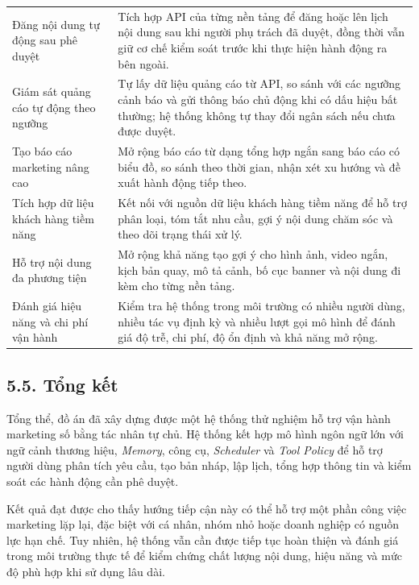 \documentclass[a4paper]{article}
\renewcommand{\arraystretch}{1.25}
\newcommand{\secx}[1]{\subsection*{#1}\phantomsection\addcontentsline{toc}{subsection}{#1}}
\begin{document}
\begin{longtable}{L{0.30\textwidth}L{0.60\textwidth}}
Đăng nội dung tự động sau phê duyệt & Tích hợp API của từng nền tảng để đăng hoặc lên lịch nội dung sau khi người phụ trách đã duyệt, đồng thời vẫn giữ cơ chế kiểm soát trước khi thực hiện hành động ra bên ngoài.\\

Giám sát quảng cáo tự động theo ngưỡng & Tự lấy dữ liệu quảng cáo từ API, so sánh với các ngưỡng cảnh báo và gửi thông báo chủ động khi có dấu hiệu bất thường; hệ thống không tự thay đổi ngân sách nếu chưa được duyệt.\\

Tạo báo cáo marketing nâng cao & Mở rộng báo cáo từ dạng tổng hợp ngắn sang báo cáo có biểu đồ, so sánh theo thời gian, nhận xét xu hướng và đề xuất hành động tiếp theo.\\

Tích hợp dữ liệu khách hàng tiềm năng & Kết nối với nguồn dữ liệu khách hàng tiềm năng để hỗ trợ phân loại, tóm tắt nhu cầu, gợi ý nội dung chăm sóc và theo dõi trạng thái xử lý.\\

Hỗ trợ nội dung đa phương tiện & Mở rộng khả năng tạo gợi ý cho hình ảnh, video ngắn, kịch bản quay, mô tả cảnh, bố cục banner và nội dung đi kèm cho từng nền tảng.\\

Đánh giá hiệu năng và chi phí vận hành & Kiểm tra hệ thống trong môi trường có nhiều người dùng, nhiều tác vụ định kỳ và nhiều lượt gọi mô hình để đánh giá độ trễ, chi phí, độ ổn định và khả năng mở rộng.\\

\bottomrule
\end{longtable}
\renewcommand{\arraystretch}{1}

\secx{5.5. Tổng kết}

Tổng thể, đồ án đã xây dựng được một hệ thống thử nghiệm hỗ trợ vận hành marketing số bằng tác nhân tự chủ. Hệ thống kết hợp mô hình ngôn ngữ lớn với ngữ cảnh thương hiệu, \textit{Memory}, công cụ, \textit{Scheduler} và \textit{Tool Policy} để hỗ trợ người dùng phân tích yêu cầu, tạo bản nháp, lập lịch, tổng hợp thông tin và kiểm soát các hành động cần phê duyệt.

Kết quả đạt được cho thấy hướng tiếp cận này có thể hỗ trợ một phần công việc marketing lặp lại, đặc biệt với cá nhân, nhóm nhỏ hoặc doanh nghiệp có nguồn lực hạn chế. Tuy nhiên, hệ thống vẫn cần được tiếp tục hoàn thiện và đánh giá trong môi trường thực tế để kiểm chứng chất lượng nội dung, hiệu năng và mức độ phù hợp khi sử dụng lâu dài.
\end{document}
